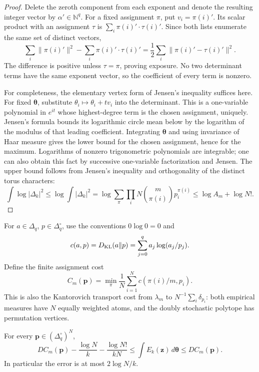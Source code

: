 \begin{proof}
Delete the zeroth component from each exponent and denote the resulting
integer vector by $\alpha'\in\mathbb N^q$. For a fixed assignment
$\pi$, put $v_i=\pi(i)'$. Its scalar product with an assignment $\tau$
is $\sum_i\pi(i)'\cdot\tau(i)'$. Since both lists enumerate the same
set of distinct vectors,
\[
 \sum_i\|\pi(i)'\|^2-
 \sum_i\pi(i)'\cdot\tau(i)'
 =\frac12\sum_i\|\pi(i)'-\tau(i)'\|^2.
\]
The difference is positive unless $\tau=\pi$, proving exposure.
No two determinant terms have the same exponent vector, so the
coefficient of every term is nonzero.

For completeness, the elementary vertex form of Jensen's inequality
suffices here. For fixed $\boldsymbol\theta$, substitute
$\theta_i\mapsto\theta_i+t v_i$ into the determinant. This is a
one-variable polynomial in $e^{it}$ whose highest-degree term is the
chosen assignment, uniquely. Jensen's formula bounds its logarithmic
circle mean below by the logarithm of the modulus of that leading
coefficient. Integrating $\boldsymbol\theta$ and using invariance of
Haar measure gives the lower bound for the chosen assignment, hence for
the maximum. Logarithms of nonzero trigonometric polynomials are
integrable; one can also obtain this fact by successive one-variable
factorization and Jensen. The upper bound follows from Jensen's
inequality and orthogonality of the distinct torus characters:
\[
 \int\log|\Delta_k|^2\le
 \log\int|\Delta_k|^2
 =\log\sum_\pi\prod_iN\binom m{\pi(i)}p_i^{\pi(i)}
 \le\log A_m+\log N!.
\]
\end{proof}

For $a\in\Delta_q$, $p\in\Delta_q^\circ$, use the conventions
$0\log0=0$ and
\[
 c(a,p)=D_{\rm KL}(a\Vert p)=\sum_{j=0}^q a_j\log(a_j/p_j).
\]
Define the finite assignment cost
\[
 C_m(\boldsymbol p)=\min_\pi\frac1N\sum_{i=1}^N
                         c(\pi(i)/m,p_i).
\]
This is also the Kantorovich transport cost from $\lambda_m$ to
$N^{-1}\sum_i\delta_{p_i}$: both empirical measures have $N$ equally
weighted atoms, and the doubly stochastic polytope has permutation
vertices.

\begin{proposition}
\label{tor:finite-certificate}
For every $\boldsymbol p\in(\Delta_q^\circ)^N$,
\begin{equation}
 D C_m(\boldsymbol p)-\frac{\log N}{k}
                       -\frac{\log N!}{kN}
 \le\int E_k(\boldsymbol z)\,d\boldsymbol\theta
 \le D C_m(\boldsymbol p).
 \label{tor:finite-certificate-bound}
\end{equation}
In particular the error is at most $2\log N/k$.
\end{proposition}

